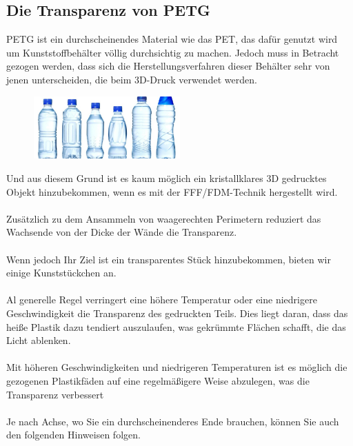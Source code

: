 \documentclass[11pt,a4paper]{article}
\begin{document}
	\subsection{Die Transparenz von PETG}PETG ist ein durchscheinendes Material wie das PET, das dafür genutzt wird um Kunststoffbehälter völlig durchsichtig zu machen. Jedoch muss in Betracht gezogen werden, dass sich die Herstellungsverfahren dieser Behälter sehr von jenen unterscheiden, die beim 3D-Druck verwendet werden.
\begin{figure}[H]
\centering
\includegraphics[width=0.5\textwidth,cfbox=azul_marcos 1pt 0pt]{FOTOS/BOTELLASPET}
\end{figure}
Und aus diesem Grund ist es kaum möglich ein kristallklares 3D gedrucktes Objekt hinzubekommen, wenn es mit der FFF/FDM-Technik hergestellt wird.
\\\\
Zusätzlich zu dem Ansammeln von waagerechten Perimetern reduziert das Wachsende von der Dicke der Wände die Transparenz.
\\\\
Wenn jedoch Ihr Ziel ist ein transparentes Stück hinzubekommen, bieten wir einige Kunststückchen an. 
\\\\
Al generelle Regel verringert eine höhere Temperatur oder eine niedrigere Geschwindigkeit die Transparenz des gedruckten Teils. Dies liegt daran, dass das heiße Plastik dazu tendiert auszulaufen, was gekrümmte Flächen schafft, die das Licht ablenken.
\\\\
Mit höheren Geschwindigkeiten und niedrigeren Temperaturen ist es möglich die gezogenen Plastikfäden auf eine regelmäßigere Weise abzulegen, was die Transparenz verbessert
\\\\
Je nach Achse, wo Sie ein durchscheinenderes Ende brauchen, können Sie auch den folgenden Hinweisen folgen.
\end{document}
